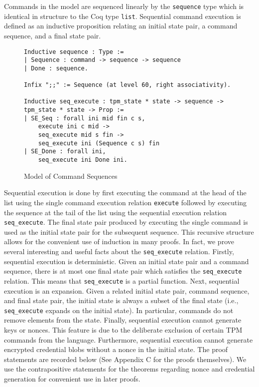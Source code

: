 Commands in the model are sequenced linearly by the \verb|sequence| type which is identical in structure to the Coq type \verb|list|. Sequential command execution is defined as an inductive proposition relating an initial state pair, a command sequence, and a final state pair. 
\begin{figure}[h]
\begin{lstlisting}[language=Coq]
Inductive sequence : Type :=
| Sequence : command -> sequence -> sequence
| Done : sequence.

Infix ";;" := Sequence (at level 60, right associativity).

Inductive seq_execute : tpm_state * state -> sequence -> tpm_state * state -> Prop :=
| SE_Seq : forall ini mid fin c s,
    execute ini c mid ->
    seq_execute mid s fin ->
    seq_execute ini (Sequence c s) fin
| SE_Done : forall ini,
    seq_execute ini Done ini.
\end{lstlisting}
\caption{Model of Command Sequences}
\end{figure}
Sequential execution is done by first executing the command at the head of the list using the single command execution relation \verb|execute| followed by executing the sequence at the tail of the list using the sequential execution relation \verb|seq_execute|. The final state pair produced by executing the single command is used as the initial state pair for the subsequent sequence. This recursive structure allows for the convenient use of induction in many proofs.
In fact, we prove several interesting and useful facts about the \verb|seq_execute| relation. Firstly, sequential execution is deterministic. Given an initial state pair and a command sequence, there is at most one final state pair which satisfies the \verb|seq_execute| relation. This means that \verb|seq_execute| is a partial function. Next, sequential execution is an expansion. Given a related initial state pair, command sequence, and final state pair, the initial state is always a subset of the final state (i.e., \verb|seq_execute| expands on the initial state). In particular, commands do not remove elements from the state. Finally, sequential execution cannot generate keys or nonces. This feature is due to the deliberate exclusion of certain TPM commands from the language. Furthermore, sequential execution cannot generate encrypted credential blobs without a nonce in the initial state. The proof statements are recorded below (See Appendix C for the proofs themselves). We use the contrapositive statements for the theorems regarding nonce and credential generation for convenient use in later proofs. 
